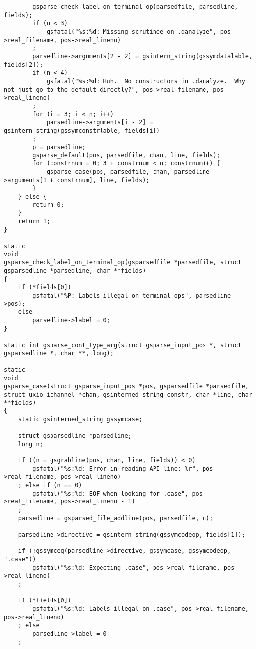 \documentclass{report}
\begin{document}
\begin{verbatim}
        gsparse_check_label_on_terminal_op(parsedfile, parsedline, fields);
        if (n < 3)
            gsfatal("%s:%d: Missing scrutinee on .danalyze", pos->real_filename, pos->real_lineno)
        ;
        parsedline->arguments[2 - 2] = gsintern_string(gssymdatalable, fields[2]);
        if (n < 4)
            gsfatal("%s:%d: Huh.  No constructors in .danalyze.  Why not just go to the default directly?", pos->real_filename, pos->real_lineno)
        ;
        for (i = 3; i < n; i++)
            parsedline->arguments[i - 2] = gsintern_string(gssymconstrlable, fields[i])
        ;
        p = parsedline;
        gsparse_default(pos, parsedfile, chan, line, fields);
        for (constrnum = 0; 3 + constrnum < n; constrnum++) {
            gsparse_case(pos, parsedfile, chan, parsedline->arguments[1 + constrnum], line, fields);
        }
    } else {
        return 0;
    }
    return 1;
}

static
void
gsparse_check_label_on_terminal_op(gsparsedfile *parsedfile, struct gsparsedline *parsedline, char **fields)
{
    if (*fields[0])
        gsfatal("%P: Labels illegal on terminal ops", parsedline->pos);
    else
        parsedline->label = 0;
}

static int gsparse_cont_type_arg(struct gsparse_input_pos *, struct gsparsedline *, char **, long);

static
void
gsparse_case(struct gsparse_input_pos *pos, gsparsedfile *parsedfile, struct uxio_ichannel *chan, gsinterned_string constr, char *line, char **fields)
{
    static gsinterned_string gssymcase;

    struct gsparsedline *parsedline;
    long n;

    if ((n = gsgrabline(pos, chan, line, fields)) < 0)
        gsfatal("%s:%d: Error in reading API line: %r", pos->real_filename, pos->real_lineno)
    ; else if (n == 0)
        gsfatal("%s:%d: EOF when looking for .case", pos->real_filename, pos->real_lineno - 1)
    ;
    parsedline = gsparsed_file_addline(pos, parsedfile, n);

    parsedline->directive = gsintern_string(gssymcodeop, fields[1]);

    if (!gssymceq(parsedline->directive, gssymcase, gssymcodeop, ".case"))
        gsfatal("%s:%d: Expecting .case", pos->real_filename, pos->real_lineno)
    ;

    if (*fields[0])
        gsfatal("%s:%d: Labels illegal on .case", pos->real_filename, pos->real_lineno)
    ; else
        parsedline->label = 0
    ;


\end{verbatim}
\end{document}
